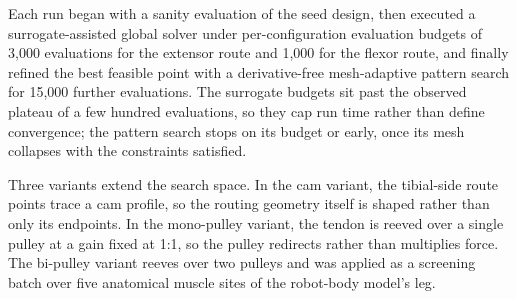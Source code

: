 Each run began with a sanity evaluation of the seed design, then executed a surrogate-assisted global solver under per-configuration evaluation budgets of 3,000 evaluations for the extensor route and 1,000 for the flexor route, and finally refined the best feasible point with a derivative-free mesh-adaptive pattern search for 15,000 further evaluations. The surrogate budgets sit past the observed plateau of a few hundred evaluations, so they cap run time rather than define convergence; the pattern search stops on its budget or early, once its mesh collapses with the constraints satisfied.

Three variants extend the search space. In the cam variant, the tibial-side route points trace a cam profile, so the routing geometry itself is shaped rather than only its endpoints. In the mono-pulley variant, the tendon is reeved over a single pulley at a gain fixed at 1:1, so the pulley redirects rather than multiplies force. The bi-pulley variant reeves over two pulleys and was applied as a screening batch over five anatomical muscle sites of the robot-body model's leg.
